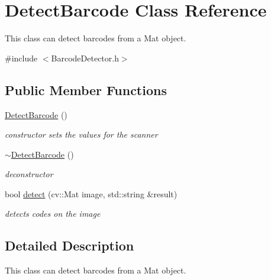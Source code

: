\hypertarget{classDetectBarcode}{
\section{DetectBarcode Class Reference}
\label{classDetectBarcode}
}


This class can detect barcodes from a Mat object.  




{\ttfamily \#include $<$BarcodeDetector.h$>$}

\subsection*{Public Member Functions}
\begin{DoxyCompactItemize}
\item 
\hypertarget{classDetectBarcode_a5f8bf8e2923ee59d768be7a9d91638e3}{
\hyperlink{classDetectBarcode_a5f8bf8e2923ee59d768be7a9d91638e3}{DetectBarcode} ()}
\label{classDetectBarcode_a5f8bf8e2923ee59d768be7a9d91638e3}

\begin{DoxyCompactList}\small\item\em constructor sets the values for the scanner \item\end{DoxyCompactList}\item 
\hypertarget{classDetectBarcode_ae53bc6d576240e222ff021e6a10dd01e}{
\hyperlink{classDetectBarcode_ae53bc6d576240e222ff021e6a10dd01e}{$\sim$DetectBarcode} ()}
\label{classDetectBarcode_ae53bc6d576240e222ff021e6a10dd01e}

\begin{DoxyCompactList}\small\item\em deconstructor \item\end{DoxyCompactList}\item 
bool \hyperlink{classDetectBarcode_a00f36bd7589d0a1a9747ad404e3de8f0}{detect} (cv::Mat image, std::string \&result)
\begin{DoxyCompactList}\small\item\em detects codes on the image \item\end{DoxyCompactList}\end{DoxyCompactItemize}


\subsection{Detailed Description}
This class can detect barcodes from a Mat object. 

